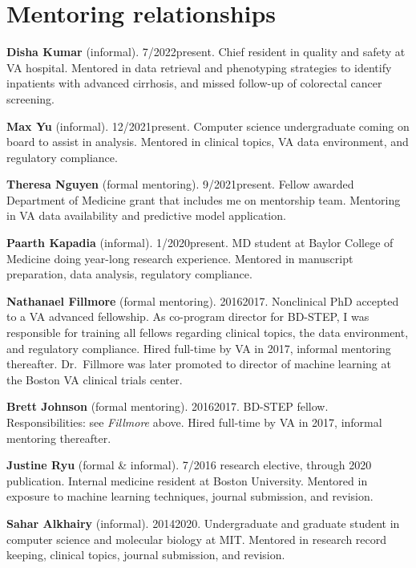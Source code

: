 \documentclass[10pt]{article}
\begin{document}
\section*{Mentoring relationships}

\textbf{Disha Kumar} (informal). 7/2022\ndash{}present. Chief resident
in quality and safety at VA hospital. Mentored in data retrieval and
phenotyping strategies to identify inpatients with advanced cirrhosis,
and missed follow-up of colorectal cancer screening.

\textbf{Max Yu} (informal). 12/2021\ndash{}present. Computer science
undergraduate coming on board to assist in analysis. Mentored in
clinical topics, VA data environment, and regulatory compliance.

\textbf{Theresa Nguyen} (formal mentoring). 9/2021\ndash{}present.
Fellow awarded Department of Medicine grant that includes me on
mentorship team. Mentoring in VA data availability and predictive
model application.

\textbf{Paarth Kapadia} (informal). 1/2020\ndash{}present. MD student
at Baylor College of Medicine doing year-long research experience.
Mentored in manuscript preparation, data analysis, regulatory
compliance.

\textbf{Nathanael Fillmore} (formal mentoring). 2016\ndash{}2017.
Nonclinical PhD accepted to a VA advanced fellowship. As co-program
director for BD-STEP, I was responsible for training all fellows
regarding clinical topics, the data environment, and regulatory
compliance. Hired full-time by VA in 2017, informal mentoring
thereafter. Dr.\ Fillmore was later promoted to director of machine
learning at the Boston VA clinical trials center.

\textbf{Brett Johnson} (formal mentoring). 2016\ndash{}2017. BD-STEP
fellow. Responsibilities: see \emph{Fillmore} above. Hired full-time
by VA in 2017, informal mentoring thereafter.

\textbf{Justine Ryu} (formal \& informal). 7/2016 research elective,
through 2020 publication. Internal medicine resident at Boston
University. Mentored in exposure to machine learning techniques,
journal submission, and revision.

\textbf{Sahar Alkhairy} (informal). 2014\ndash{}2020. Undergraduate
and graduate student in computer science and molecular biology at MIT.
Mentored in research record keeping, clinical topics, journal
submission, and revision.
\end{document}
